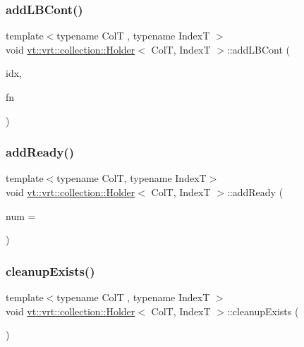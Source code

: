 \subsubsection{\texorpdfstring{add\+L\+B\+Cont()}{addLBCont()}}
{\footnotesize\ttfamily template$<$typename ColT , typename IndexT $>$ \\
void \hyperlink{structvt_1_1vrt_1_1collection_1_1_holder}{vt\+::vrt\+::collection\+::\+Holder}$<$ ColT, IndexT $>$\+::add\+L\+B\+Cont (\begin{DoxyParamCaption}\item[{IndexT const \&}]{idx,  }\item[{\hyperlink{structvt_1_1vrt_1_1collection_1_1_holder_a01812f8ee06d3a67e1a9aa2765989913}{L\+B\+Cont\+Fn\+Type}}]{fn }\end{DoxyParamCaption})}

\mbox{\label{structvt_1_1vrt_1_1collection_1_1_holder_ac41862395e0a1f6d0e68ebcd17c44824}} 
\subsubsection{\texorpdfstring{add\+Ready()}{addReady()}}
{\footnotesize\ttfamily template$<$typename ColT, typename IndexT$>$ \\
void \hyperlink{structvt_1_1vrt_1_1collection_1_1_holder}{vt\+::vrt\+::collection\+::\+Holder}$<$ ColT, IndexT $>$\+::add\+Ready (\begin{DoxyParamCaption}\item[{\hyperlink{structvt_1_1vrt_1_1collection_1_1_holder_a3251a556ac19fc7dc4d0bd388cfaedeb}{Count\+Type}}]{num = {} }\end{DoxyParamCaption})\hspace{0.3cm}{\ttfamily [inline]}}

\mbox{\label{structvt_1_1vrt_1_1collection_1_1_holder_aa6641e97e87778904b76dba93a69bb56}} 
\subsubsection{\texorpdfstring{cleanup\+Exists()}{cleanupExists()}}
{\footnotesize\ttfamily template$<$typename ColT , typename IndexT $>$ \\
void \hyperlink{structvt_1_1vrt_1_1collection_1_1_holder}{vt\+::vrt\+::collection\+::\+Holder}$<$ ColT, IndexT $>$\+::cleanup\+Exists (\begin{DoxyParamCaption}{ }\end{DoxyParamCaption})}

